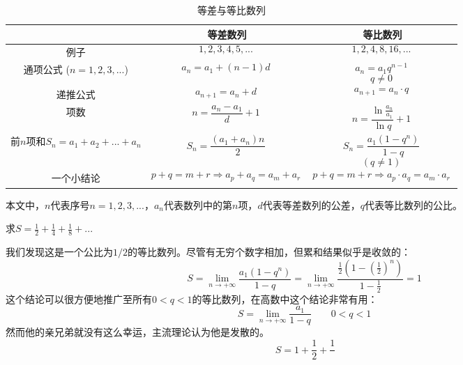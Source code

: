 

\begin{table}[ht]
\centering
\caption{等差与等比数列}\label{tab_AGS1}
\begin{tabular}{|c|c|c|}
\hline
 & 等差数列 & 等比数列 \\
\hline
例子 & $$1,2,3,4,5,...~$$ & $$1,2,4,8,16,...~$$ \\
\hline
通项公式 ($n=1,2,3,...$) & $$a_n = a_1 + (n-1)d~$$ & $$a_n = a_1 q^{n-1}~$$ $$q\ne0~$$ \\
\hline
递推公式 & $$a_{n+1} = a_n + d~$$ & $$a_{n+1} = a_n \cdot q~$$ \\
\hline
项数& $$n = \frac{a_n-a_1}{d} + 1~$$ & $$n = \frac{\ln{\frac{a_n}{a_1}}}{\ln{q}} + 1~$$ \\
\hline
前$n$项和$S_n=a_1+a_2+...+a_n$& $$S_n=\frac{(a_1+a_n)n}{2}~$$ & $$S_n = \frac{a_1 (1-q^n)}{1-q}~$$ $$(q\ne 1)~$$ \\
\hline
一个小结论 & $$p+q=m+r \Rightarrow a_p+a_q = a_m + a_r~$$ & $$p+q=m+r \Rightarrow a_p \cdot a_q = a_m \cdot a_r~$$ \\
\hline
\end{tabular}
\end{table}

本文中，$n$代表序号$n=1,2,3,...$，$a_n$代表数列中的第$n$项，$d$代表等差数列的公差，$q$代表等比数列的公比。

\begin{example}{}
求$S = \frac{1}{2}+\frac{1}{4}+\frac{1}{8}+...$

我们发现这是一个公比为$1/2$的等比数列。尽管有无穷个数字相加，但累和结果似乎是收敛的：
$$S = \lim_{n \to +\infty} \frac{a_1 (1-q^n)}{1-q}
= \lim_{n \to +\infty} \frac{\frac{1}{2} (1-(\frac{1}{2})^n)}{1-\frac{1}{2}}
=1 ~$$
这个结论可以很方便地推广至所有$0<q<1$的等比数列，在高数中这个结论非常有用：
$$S = \lim_{n \to +\infty} \frac{a_1}{1-q} \qquad 0<q<1~$$
然而他的亲兄弟就没有这么幸运，主流理论认为他是发散的。
$$S = 1+\frac{1}{2}+\frac{1}{}$$
\end{example}